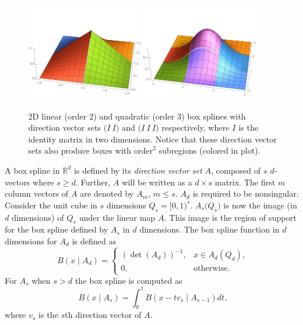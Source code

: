\begin{figure}
  \centering
  \includegraphics[width=0.45\textwidth]{Figures/ACM/2D-linear.pdf}
  \includegraphics[width=0.45\textwidth]{Figures/ACM/2D-quadratic.pdf}
  \caption{2D linear (order 2) and quadratic (order 3) box splines with direction vector sets $\bigl( I \ I \bigr)$ and $\bigl( I \ I \ I \bigr)$ respectively, where $I$ is the identity matrix in two dimensions. Notice that these direction vector sets also produce boxes with $\text{order}^2$ subregions (colored in plot).}
  \label{fig_2D_boxes}
\end{figure}

A box spline in $\mathbb{R}^d$ is defined by its \textit{direction vector set} $A$, composed of $s$ $d$-vectors where $s \geq d$. Further, $A$ will be written as a $d \times s$ matrix. The first $m$ column vectors of $A$ are denoted by $A_m$, $m \leq s$. $A_d$ is required to be nonsingular. Consider the unit cube in $s$ dimensions $Q_s = [0,1)^s$. $A_s \bigl( Q_s \bigr)$ is now the image (in $d$ dimensions) of $Q_s$ under the linear map $A$. This image is the region of support for the box spline defined by $A_s$ in $d$ dimensions. The box spline function in $d$ dimensions for $A_d$ is defined as
\begin{equation}
B(x \mid A_d) = \begin{cases} 
(\det(A_d))^{-1}, & x \in A_d(Q_d), \\
0,                & \text{otherwise.}
\end{cases}
\label{eq_box_base}
\end{equation}
For $A_s$ when $s > d$ the box spline is computed as
\begin{equation}
B(x \mid A_s) = \int_0^1 B(x - t v_s \mid A_{s-1}) dt,
\label{eq_box_recursive}
\end{equation}
where $v_s$ is the $s$th direction vector of $A$.

